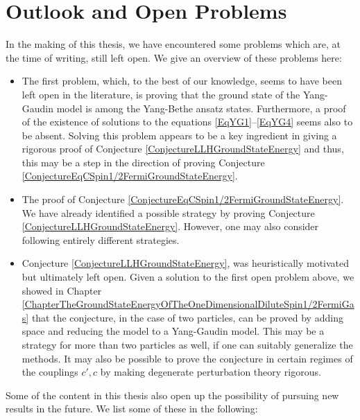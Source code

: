 \section{Outlook and Open Problems}
 In the making of this thesis, we have encountered some problems which are, at the time of writing, still left open. We give an overview of these problems here:
 \begin{itemize}
 	\item The first problem, which, to the best of our knowledge, seems to have been left open in the literature, is proving that the ground state of the Yang-Gaudin model is among the Yang-Bethe ansatz states. Furthermore, a proof of the existence of solutions to the equations \eqref{EqYG1}--\eqref{EqYG4} seems also to be absent. Solving this problem appears to be a key ingredient in giving a rigorous proof of Conjecture \ref{ConjectureLLHGroundStateEnergy} and thus, this may be a step in the direction of proving Conjecture \ref{ConjectureEqCSpin1/2FermiGroundStateEnergy}.
 	\item The proof of Conjecture \ref{ConjectureEqCSpin1/2FermiGroundStateEnergy}. We have already identified a possible strategy by proving Conjecture \ref{ConjectureLLHGroundStateEnergy}. However, one may also consider following entirely different strategies.
 	\item Conjecture \ref{ConjectureLLHGroundStateEnergy}, was heuristically motivated but ultimately left open. Given a solution to the first open problem above, we showed in Chapter \ref{ChapterTheGroundStateEnergyOfTheOneDimensionalDiluteSpin1/2FermiGas} that the conjecture, in the case of two particles, can be proved by adding space and reducing the model to a Yang-Gaudin model. This may be a strategy for more than two particles as well, if one can suitably generalize the methods. It may also be possible to prove the conjecture in certain regimes of the couplings $ c',c $ by making degenerate perturbation theory rigorous.
 \end{itemize}
Some of the content in this thesis also open up the possibility of pursuing new results in the future. We list some of these in the following:
